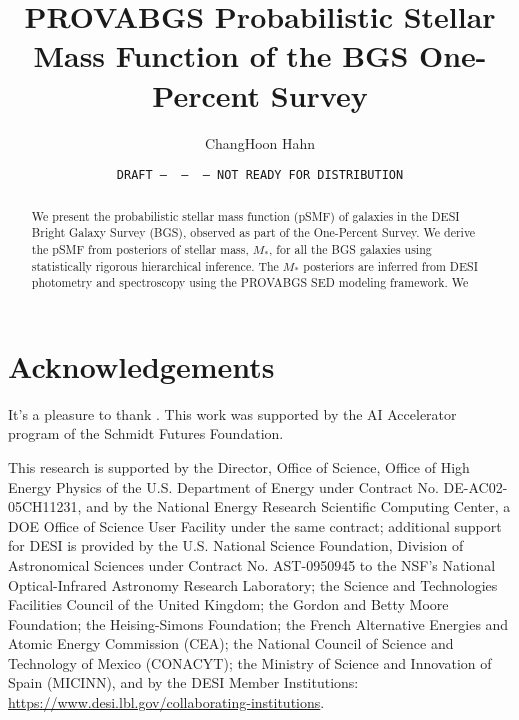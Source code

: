\documentclass[12pt, letterpaper, preprint, comicneue]{aastex63}
\begin{document}
 \sloppy\sloppypar\frenchspacing 

\title{PROVABGS Probabilistic Stellar Mass Function of the BGS One-Percent
Survey} 
\date{\texttt{DRAFT~---~\githash~---~\gitdate~---~NOT READY FOR DISTRIBUTION}}

\author{ChangHoon Hahn}

\begin{abstract}
    We present the probabilistic stellar mass function (pSMF) of galaxies in
    the DESI Bright Galaxy Survey (BGS), observed as part of the One-Percent Survey. 
    We derive the pSMF from posteriors of stellar mass, $M_*$, for all the BGS
    galaxies using statistically rigorous hierarchical inference.
    The $M_*$ posteriors are inferred from DESI photometry and spectroscopy
    using the \cite{hahn2022} PROVABGS SED modeling framework. 
    We 
\end{abstract}








\section*{Acknowledgements}
It's a pleasure to thank . 
This work was supported by the AI Accelerator program of the Schmidt Futures
Foundation.

This research is supported by the Director, Office of Science, Office of High
Energy Physics of the U.S. Department of Energy under Contract No.
DE-AC02-05CH11231, and by the National Energy Research Scientific Computing
Center, a DOE Office of Science User Facility under the same contract;
additional support for DESI is provided by the U.S. National Science
Foundation, Division of Astronomical Sciences under Contract No. AST-0950945 to
the NSF's National Optical-Infrared Astronomy Research Laboratory; the Science
and Technologies Facilities Council of the United Kingdom; the Gordon and Betty
Moore Foundation; the Heising-Simons Foundation; the French Alternative
Energies and Atomic Energy Commission (CEA); the National Council of Science
and Technology of Mexico (CONACYT); the Ministry of Science and Innovation of
Spain (MICINN), and by the DESI Member Institutions:
\url{https://www.desi.lbl.gov/collaborating-institutions}.
\end{document}
